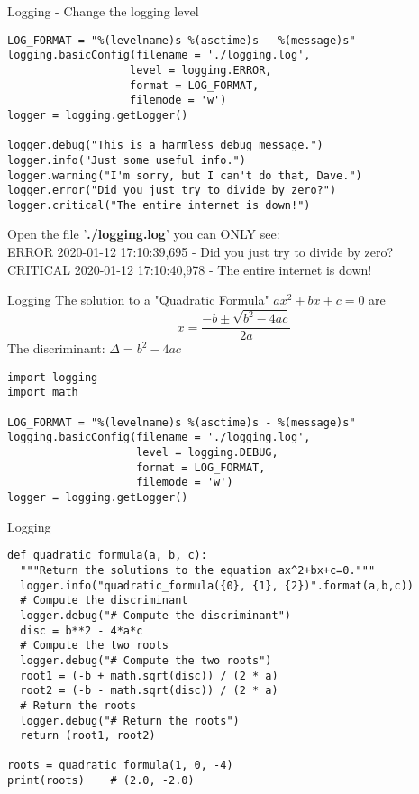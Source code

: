 \documentclass{beamer}
\begin{document}
\begin{frame}[fragile]{Logging - Change the logging level}
\begin{verbatim}
LOG_FORMAT = "%(levelname)s %(asctime)s - %(message)s"
logging.basicConfig(filename = './logging.log',
                   level = logging.ERROR,
                   format = LOG_FORMAT,
                   filemode = 'w')
logger = logging.getLogger()

logger.debug("This is a harmless debug message.")
logger.info("Just some useful info.")
logger.warning("I'm sorry, but I can't do that, Dave.")
logger.error("Did you just try to divide by zero?")
logger.critical("The entire internet is down!")
\end{verbatim}
Open the file '\textbf{./logging.log}' you can ONLY see:\\
ERROR 2020-01-12 17:10:39,695 - Did you just try to divide by zero?\\
CRITICAL 2020-01-12 17:10:40,978 - The entire internet is down!
\end{frame}

\begin{frame}[fragile]{Logging}
The solution to a "Quadratic Formula" $ax^2+bx+c=0$ are\\
$$
x=\frac{-b\pm\sqrt{b^2-4ac}}{2a}
$$
The discriminant: $\Delta=b^2-4ac$
\begin{verbatim}
import logging
import math

LOG_FORMAT = "%(levelname)s %(asctime)s - %(message)s"
logging.basicConfig(filename = './logging.log',
                    level = logging.DEBUG,
                    format = LOG_FORMAT,
                    filemode = 'w')
logger = logging.getLogger()

\end{verbatim}
\end{frame}

\begin{frame}[fragile]{Logging}
\begin{verbatim}
def quadratic_formula(a, b, c):
  """Return the solutions to the equation ax^2+bx+c=0."""
  logger.info("quadratic_formula({0}, {1}, {2})".format(a,b,c))
  # Compute the discriminant
  logger.debug("# Compute the discriminant")
  disc = b**2 - 4*a*c
  # Compute the two roots
  logger.debug("# Compute the two roots")
  root1 = (-b + math.sqrt(disc)) / (2 * a)
  root2 = (-b - math.sqrt(disc)) / (2 * a)
  # Return the roots
  logger.debug("# Return the roots")
  return (root1, root2)

roots = quadratic_formula(1, 0, -4)
print(roots)    # (2.0, -2.0)
\end{verbatim}
\end{frame}
\end{document}
